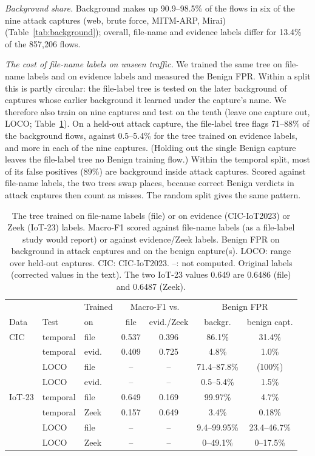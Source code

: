 \emph{Background share.} Background makes up 90.9--98.5\% of the flows in six of the nine attack captures (web, brute force, MITM-ARP, Mirai) (Table~\ref{tab:background}); overall, file-name and evidence labels differ for 13.4\% of the 857,206 flows.

\emph{The cost of file-name labels on unseen traffic.} We trained the same tree on file-name labels and on evidence labels and measured the Benign FPR. Within a split this is partly circular: the file-label tree is tested on the later background of captures whose earlier background it learned under the capture's name. We therefore also train on nine captures and test on the tenth (leave one capture out, LOCO; Table~\ref{tab:filelabel}). On a held-out attack capture, the file-label tree flags 71--88\% of the background flows, against 0.5--5.4\% for the tree trained on evidence labels, and more in each of the nine captures. (Holding out the single Benign capture leaves the file-label tree no Benign training flow.) Within the temporal split, most of its false positives (89\%) are background inside attack captures. Scored against file-name labels, the two trees swap places, because correct Benign verdicts in attack captures then count as misses. The random split gives the same pattern.

\begin{table}[t]
\centering
\caption{The tree trained on file-name labels (file) or on evidence (CIC-IoT2023) or Zeek (IoT-23) labels. Macro-F1 scored against file-name labels (as a file-label study would report) or against evidence/Zeek labels. Benign FPR on background in attack captures and on the benign capture(s). LOCO: range over held-out captures. CIC: CIC-IoT2023. --: not computed. Original labels (corrected values in the text). The two IoT-23 values 0.649 are 0.6486 (file) and 0.6487 (Zeek).}
\label{tab:filelabel}
\footnotesize
\setlength{\tabcolsep}{2.6pt}
\begin{tabular}{lllcccc}
\hline
 & & Trained & \multicolumn{2}{c}{Macro-F1 vs.} & \multicolumn{2}{c}{Benign FPR} \\
Data & Test & on & file & evid./Zeek & backgr. & benign capt. \\
\hline
CIC & temporal & file  & 0.537 & 0.396 & 86.1\% & 31.4\% \\
            & temporal & evid. & 0.409 & 0.725 & 4.8\% & 1.0\% \\
            & LOCO     & file  & --    & --    & 71.4--87.8\% & (100\%) \\
            & LOCO     & evid. & --    & --    & 0.5--5.4\% & 1.5\% \\
\hline
IoT-23      & temporal & file  & 0.649 & 0.169 & 99.97\% & 4.7\% \\
            & temporal & Zeek  & 0.157 & 0.649 & 3.4\% & 0.18\% \\
            & LOCO     & file  & --    & --    & 9.4--99.95\% & 23.4--46.7\% \\
            & LOCO     & Zeek  & --    & --    & 0--49.1\% & 0--17.5\% \\
\hline
\end{tabular}
\end{table}

